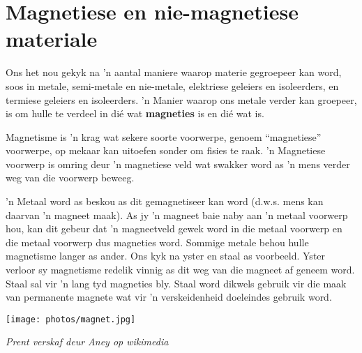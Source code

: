             \section{Magnetiese en nie-magnetiese materiale}
            \nopagebreak
      \label{m38706*id67151}Ons het nou gekyk na 'n aantal maniere waarop materie gegroepeer kan word, soos in metale, semi-metale en nie-metale, elektriese geleiers en isoleerders, en termiese geleiers en isoleerders. 'n Manier waarop ons metale verder kan groepeer, is om hulle te verdeel in di\'e wat \textbf{magneties} is en di\'e wat  is.\par 
{} 
\Definition{   \label{id2410309} { Magnetisme }} { \label{m38706*meaningfhsst!!!underscore!!!id570}
      \label{m38706*id67174}       Magnetisme is 'n krag wat sekere soorte voorwerpe, genoem ``magnetiese'' voorwerpe, op mekaar kan uitoefen sonder om fisies te raak. 'n Magnetiese voorwerp is omring deur 'n magnetiese veld wat swakker word as 'n mens verder weg van die voorwerp beweeg.\par 
       } 
\begin{minipage}{.5\textwidth}
      \label{m38706*id67186} 'n Metaal word as  beskou as dit gemagnetiseer kan word (d.w.s. mens kan daarvan 'n magneet maak). As jy 'n magneet baie naby aan 'n metaal voorwerp hou, kan dit gebeur dat 'n magneetveld gewek word in die metaal voorwerp en die metaal voorwerp dus magneties word. Sommige metale behou hulle magnetisme langer as ander. Ons kyk na yster en staal as voorbeeld. Yster verloor sy magnetisme redelik vinnig as dit weg van die magneet af geneem word. Staal sal vir 'n lang tyd magneties bly. Staal word dikwels gebruik vir die maak van permanente magnete wat vir 'n verskeidenheid doeleindes gebruik word.\par 
\end{minipage}
\begin{minipage}{.5\textwidth}
\begin{center}
 \texttt{[image: photos/magnet.jpg]}\par
\textit{Prent verskaf deur Aney op wikimedia}
\end{center}
\end{minipage}
